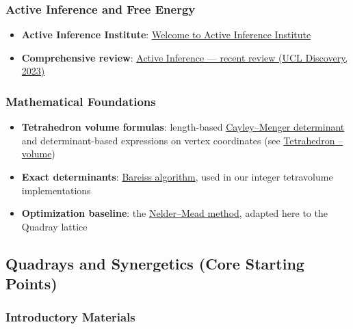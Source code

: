 \documentclass[
  10pt,
]{article}
\providecommand{\tightlist}{%
  \setlength{\itemsep}{0pt}\setlength{\parskip}{0pt}}
\begin{document}
\hypertarget{active-inference-and-free-energy-1}{%
\subsubsection{Active Inference and Free
Energy}\label{active-inference-and-free-energy-1}}

\begin{itemize}
\tightlist
\item
  \textbf{Active Inference Institute}:
  \href{https://welcome.activeinference.institute/}{Welcome to Active
  Inference Institute}
\item
  \textbf{Comprehensive review}:
  \href{https://discovery.ucl.ac.uk/id/eprint/10176959/1/1-s2.0-S1571064523001094-main.pdf}{Active
  Inference --- recent review (UCL Discovery, 2023)}
\end{itemize}

\hypertarget{mathematical-foundations}{%
\subsubsection{Mathematical
Foundations}\label{mathematical-foundations}}

\begin{itemize}
\tightlist
\item
  \textbf{Tetrahedron volume formulas}: length-based
  \href{https://en.wikipedia.org/wiki/Cayley\%E2\%80\%93Menger_determinant}{Cayley--Menger
  determinant} and determinant-based expressions on vertex coordinates
  (see
  \href{https://en.wikipedia.org/wiki/Tetrahedron\#Volume}{Tetrahedron
  -- volume})
\item
  \textbf{Exact determinants}:
  \href{https://en.wikipedia.org/wiki/Bareiss_algorithm}{Bareiss
  algorithm}, used in our integer tetravolume implementations
\item
  \textbf{Optimization baseline}: the
  \href{https://en.wikipedia.org/wiki/Nelder\%E2\%80\%93Mead_method}{Nelder--Mead
  method}, adapted here to the Quadray lattice
\end{itemize}

\hypertarget{quadrays-and-synergetics-core-starting-points}{%
\subsection{Quadrays and Synergetics (Core Starting
Points)}\label{quadrays-and-synergetics-core-starting-points}}

\hypertarget{introductory-materials}{%
\subsubsection{Introductory Materials}\label{introductory-materials}}
\end{document}
